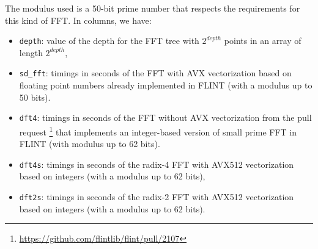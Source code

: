 \documentclass[a4paper]{article}
\begin{document}
\bigskip
The modulus used is a 50-bit prime number that respects the requirements for this kind of FFT.
In columns, we have:
\begin{itemize}
    \item \texttt{depth}: value of the depth for the FFT tree with $2^{depth}$ points
    in an array of length $2^{depth}$,
    \item \texttt{sd\_fft}: timings in seconds of the FFT with AVX vectorization based on floating point numbers
    already implemented in FLINT (with a modulus up to 50 bits).
    \item \texttt{dft4}: timings in seconds of the FFT without AVX vectorization from the pull request
    \footnote{\url{https://github.com/flintlib/flint/pull/2107}} that implements an integer-based 
    version of small prime FFT in FLINT (with modulus up to 62 bits).    
    \item \texttt{dft4s}: timings in seconds of the radix-4 FFT with AVX512 vectorization based on integers (with a modulus up to 62 bits),
    \item \texttt{dft2s}: timings in seconds of the radix-2 FFT with AVX512 vectorization based on integers (with a modulus up to 62 bits).
\end{itemize}
\end{document}
